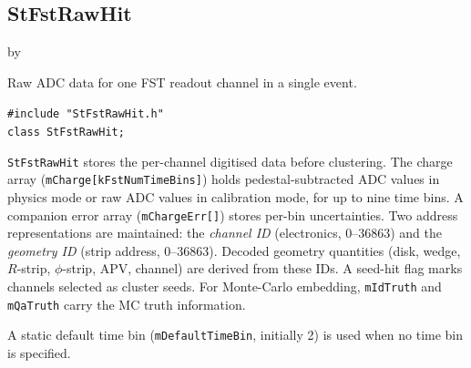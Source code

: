 \documentclass[twoside]{article}
\newcommand{\entrylabel}[1]{\mbox{\textbf{{#1}}}\hfil}%
\newenvironment{entry}
{\begin{list}{}%
    {\renewcommand{\makelabel}{\entrylabel}%
     \setlength{\labelwidth}{90pt}%
     \setlength{\leftmargin}{\labelwidth}
     \advance\leftmargin by \labelsep%
      }%
    }%
  {\end{list}}
\newcommand{\Entrylabel}[1]%
{\raisebox{0pt}[1ex][0pt]{\makebox[\labelwidth][l]%
    {\parbox[t]{\labelwidth}{\hspace{0pt}\textbf{{#1}}}}}}
\newenvironment{Entry}%
{\renewcommand{\entrylabel}{\Entrylabel}\begin{entry}}%
  {\end{entry}}
\begin{document}
\subsection{StFstRawHit}
\label{sec:StFstRawHit}
\begin{Entry}
\item[Summary] Raw ADC data for one FST readout channel in a single event.
\item[Synopsis]
    \verb+#include "StFstRawHit.h"+\\
    \verb+class StFstRawHit;+\\
\item[Description]
  \texttt{StFstRawHit} stores the per-channel digitised data before clustering.  The
  charge array (\texttt{mCharge[kFstNumTimeBins]}) holds pedestal-subtracted ADC values
  in physics mode or raw ADC values in calibration mode, for up to nine time bins.  A
  companion error array (\texttt{mChargeErr[]}) stores per-bin uncertainties.  Two
  address representations are maintained: the \emph{channel ID} (electronics, 0--36863)
  and the \emph{geometry ID} (strip address, 0--36863).  Decoded geometry quantities
  (disk, wedge, $R$-strip, $\phi$-strip, APV, channel) are derived from these IDs.  A
  seed-hit flag marks channels selected as cluster seeds.  For Monte-Carlo embedding,
  \texttt{mIdTruth} and \texttt{mQaTruth} carry the MC truth information.

  A static default time bin (\texttt{mDefaultTimeBin}, initially 2) is used when no time
  bin is specified.


\end{Entry}
\end{document}

